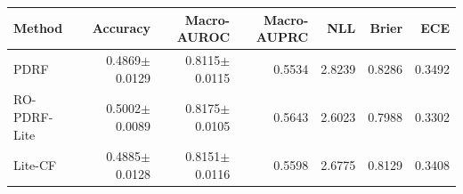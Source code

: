 \begin{tabular}{lrrrrrr}
\toprule
Method & Accuracy & Macro-AUROC & Macro-AUPRC & NLL & Brier & ECE \\
\midrule
PDRF & 0.4869$\pm$0.0129 & 0.8115$\pm$0.0115 & 0.5534 & 2.8239 & 0.8286 & 0.3492 \\
RO-PDRF-Lite & 0.5002$\pm$0.0089 & 0.8175$\pm$0.0105 & 0.5643 & 2.6023 & 0.7988 & 0.3302 \\
Lite-CF & 0.4885$\pm$0.0128 & 0.8151$\pm$0.0116 & 0.5598 & 2.6775 & 0.8129 & 0.3408 \\
\bottomrule
\end{tabular}
